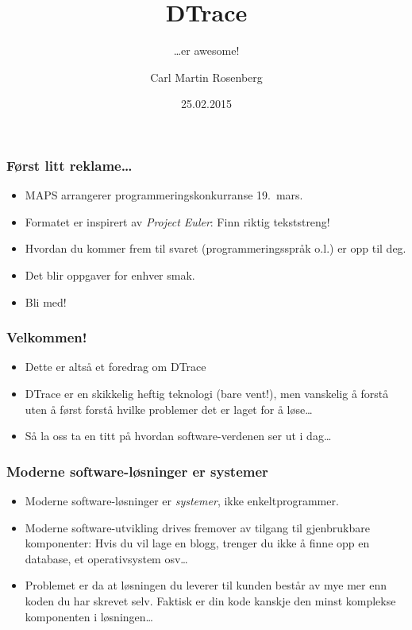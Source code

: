 \documentclass{beamer}
\title{DTrace}
\subtitle{…er awesome!}
\author{Carl Martin Rosenberg}
\institute{MAPS}
\date{25.02.2015}
\begin{document}
\frame{\titlepage}

\begin{frame}
\frametitle{Først litt reklame…}

\begin{itemize}
    \item MAPS arrangerer programmeringskonkurranse 19.\ mars.
 \item Formatet er inspirert av \emph{Project Euler}: Finn riktig
     tekststreng!
 \item Hvordan du kommer frem til svaret (programmeringsspråk o.l.)
     er opp til deg.
 \item Det blir oppgaver for enhver smak.
 \item Bli med!
\end{itemize}

\end{frame}

\begin{frame}
\frametitle{Velkommen!}

\begin{itemize}
    \item Dette er altså et foredrag om DTrace

    \item DTrace er en skikkelig heftig teknologi (bare vent!),
    men vanskelig å forstå uten å først forstå hvilke problemer
    det er laget for å løse…

    \item Så la oss ta en titt på
    hvordan software-verdenen ser ut i dag…
\end{itemize}

\end{frame}

\begin{frame}
    \frametitle{Moderne software-løsninger er systemer}

\begin{itemize}

    \item Moderne software-løsninger er \emph{systemer}, ikke enkeltprogrammer.

    \item Moderne software-utvikling drives fremover av
      tilgang til gjenbrukbare komponenter: Hvis du vil lage en blogg, trenger
      du ikke å finne opp en database, et operativsystem osv…

  \item Problemet er da at løsningen du leverer til kunden består av mye mer enn
      koden du har skrevet selv. Faktisk er din kode kanskje den minst
      komplekse komponenten i løsningen…

\end{itemize}
\end{frame}
\end{document}
